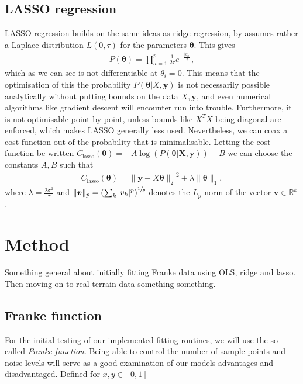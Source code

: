 \documentclass[twocolumn,english,notitlepage]{article}
\renewcommand{\vec}[1]{\boldsymbol{#1}}
\newcommand{\pclosed}[1]{\left(#1\right)}
\renewcommand{\norm}[2][]{\ensuremath{\|#2\|_{#1}}}
\renewcommand{\exp}[1]{e^{#1}}
\newcommand{\msub}[2]{\ensuremath{{#1}_\text{#2}}}
\begin{document}
    \subsection{LASSO regression}
        LASSO regression builds on the same ideas as ridge regression, by assumes rather a Laplace distribution $L(0, \tau)$ for the parameters $\vec{\theta}$. This gives
        \begin{align}
            P(\vec{\theta}) = \prod_{a=1}^{p} \frac{1}{2\tau} \exp{-\frac{|\theta_a|}{\tau}},
        \end{align}
        which as we can see is not differentiable at $\theta_i = 0$. This means that the optimisation of this the probability $P(\vec{\theta}|X, \vec{y})$ is not necessarily possible analytically without putting bounds on the data $X, \vec{y}$, and even numerical algorithms like gradient descent will encounter run into trouble. Furthermore, it is not optimisable point by point, unless bounds like $X^TX$ being diagonal are enforced, which makes LASSO generally less used. Nevertheless, we can coax a cost function out of the probability that is minimalisable. Letting the cost function be written $\msub{C}{lasso}(\vec{\theta}) = -A\log\pclosed{P(\vec{\theta|X,\vec{y}})} + B$  we can choose the constants $A, B$ such that
        \begin{align}
            \boxed{
                \msub{C}{lasso}(\vec{\vec{\theta}}) = \norm[2]{ \vec{y} - X\vec{\theta} }^2 + \lambda \norm[1]{\vec{\theta}},
            }
        \end{align}
        where $\lambda = \frac{2\sigma^2}{\tau}$ and $\norm[p]{\vec{v}} = \pclosed{\sum_k |v_k|^p}^{\sfrac{1}{p}}$ denotes the $L_p$ norm of the vector $\vec{v} \in \mathbb{R}^k$.


\section{Method}
Something general about initially fitting Franke data using OLS, ridge and lasso. Then moving on to real terrain data something something.
    
    \subsection{Franke function}

    For the initial testing of our implemented fitting routines, we will use the so called \textit{Franke function}. Being able to control the number of sample points and noise levels will serve as a good examination of our models advantages and disadvantaged. Defined for $x, y \in [0,1]$
\end{document}
